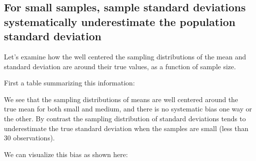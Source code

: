 \documentclass[]{book}
\newenvironment{Shaded}{\begin{snugshade}}{\end{snugshade}}
\newcommand{\CommentTok}[1]{\textcolor[rgb]{0.56,0.35,0.01}{\textit{#1}}}
\newcommand{\DataTypeTok}[1]{\textcolor[rgb]{0.13,0.29,0.53}{#1}}
\newcommand{\KeywordTok}[1]{\textcolor[rgb]{0.13,0.29,0.53}{\textbf{#1}}}
\newcommand{\NormalTok}[1]{#1}
\newcommand{\OperatorTok}[1]{\textcolor[rgb]{0.81,0.36,0.00}{\textbf{#1}}}
\newcommand{\StringTok}[1]{\textcolor[rgb]{0.31,0.60,0.02}{#1}}
\theoremstyle{definition}
\theoremstyle{definition}
\theoremstyle{definition}
\theoremstyle{remark}
\begin{document}
\hypertarget{for-small-samples-sample-standard-deviations-systematically-underestimate-the-population-standard-deviation}{%
\subsection{For small samples, sample standard deviations systematically
underestimate the population standard
deviation}\label{for-small-samples-sample-standard-deviations-systematically-underestimate-the-population-standard-deviation}}

Let's examine how the well centered the sampling distributions of the
mean and standard deviation are around their true values, as a function
of sample size.

First a table summarizing this information:

\begin{Shaded}
\end{Shaded}

We see that the sampling distributions of means are well centered around
the true mean for both small and medium, and there is no systematic bias
one way or the other. By contrast the sampling distribution of standard
deviations tends to underestimate the true standard deviation when the
samples are small (less than 30 observations).

We can visualize this bias as shown here:
\end{document}
